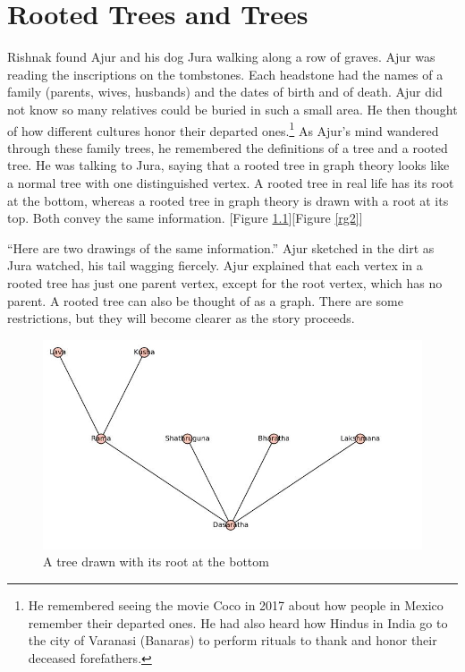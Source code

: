 \chapter{Rooted Trees and Trees}

Rishnak found Ajur and his dog Jura walking along a row of graves. Ajur was reading the inscriptions on the tombstones. Each headstone had the names of a family (parents, wives, husbands) and the dates of birth and of death. Ajur did not know so many relatives could be buried in such a small area. He then thought of how different cultures honor their departed ones.\footnote{He remembered seeing the movie Coco in 2017 about how people in Mexico remember their departed ones. He had also heard how Hindus in India go to the city of Varanasi (Banaras) to perform rituals to thank and honor their deceased forefathers.}
As Ajur's mind wandered through these family trees, he remembered the definitions of a tree and a rooted tree. He was talking to Jura, saying that a rooted tree in graph theory looks like a normal tree with one distinguished vertex. A rooted tree in real life has its root at the bottom, whereas a rooted tree in graph theory is drawn with a root at its top. Both convey the same information. [Figure \ref{rg1}][Figure \ref{rg2}]

``Here are two drawings of the same information.'' Ajur sketched in the dirt as Jura watched, his tail wagging fiercely. Ajur explained that each vertex in a rooted tree has just one parent vertex, except for the root vertex, which has no parent. A rooted tree can also be thought of as a graph. There are some restrictions, but they will become clearer as the story proceeds.


\begin{figure}
\begin{center}
\includegraphics[width=\textwidth]{tree1.JPG}
\caption{A tree drawn with its root at the bottom}\label{rg1}
\end{center}
\end{figure}

